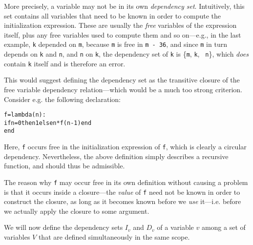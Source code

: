   
More precisely, a variable may not be in its own {\em dependency set}.
Intuitively, this set contains all variables that need to be known in
order to compute the initialization expression. These are usually the
{\em free} variables of the expression itself, plus any free variables
used to compute them and so on---e.g., in the last example, {\tt k}
depended on {\tt m}, because {\tt m} is free in {\tt m - 36}, and
since {\tt m} in turn depends on {\tt k} and {\tt n}, and {\tt n} on
{\tt k}, the dependency set of {\tt k} is \{{\tt m}, {\tt k}, {\tt
  n}\}, which {\em does} contain {\tt k} itself and is therefore an
error.

This would suggest defining the dependency set as the transitive
closure of the free variable dependency relation---which would be a
much too strong criterion. Consider e.g. the following declaration:
\begin{alltt}
  f = lambda (n) :
    if n = 0 then 1 else n * f(n - 1) end
  end
\end{alltt}

 
Here, {\tt f} occurs free in the initialization expression of {\tt f},
which is clearly a circular dependency. Nevertheless, the above
definition simply describes a recursive function, and should thus be
admissible.

The reason why {\tt f} may occur free in its own definition without
causing a problem is that it occurs inside a closure---the {\em value}
of {\tt f} need not be known in order to construct the closure, as long
as it becomes known before we {\em use} it---i.e. before we actually
apply the closure to some argument.

We will now define the dependency sets $I_v$ and $D_v$ of a variable
$v$ among a set of variables $V$ that are defined simultaneously in
the same scope.

